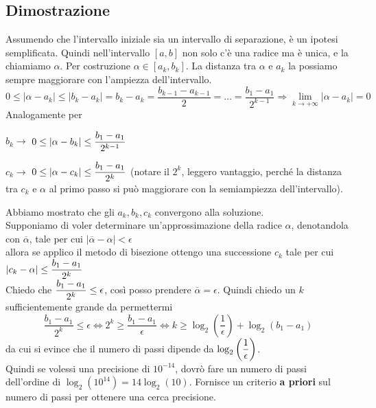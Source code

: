\documentclass[10pt]{book}
\begin{document}
\subsection{Dimostrazione} Assumendo che l'intervallo iniziale sia un intervallo di separazione, è un ipotesi semplificata. Quindi nell'intervallo $[a, b]$ non solo c'è una radice ma è unica, e la chiamiamo $\alpha$. Per costruzione $\alpha \in [a_k, b_k]$. La distanza tra $\alpha$ e $a_k$ la possiamo sempre maggiorare con l'ampiezza dell'intervallo.
$$0 \leq |\alpha - a_k| \leq |b_k - a_k| = b_k - a_k = \frac{b_{k-1} - a_{k-1}}{2} = \ldots = \frac{b_1 - a_1}{2^{k-1}} \Rightarrow \lim_{k\to +\infty} |\alpha - a_k| = 0$$
Analogamente per \begin{list}{}{}
	\item $b_k\rightarrow$ $0\leq |\alpha - b_k| \leq \mathlarger{\frac{b_1 - a_1}{2^{k-1}}}$
	\item $c_k\rightarrow$ $0\leq |\alpha - c_k| \leq \mathlarger{\frac{b_1 - a_1}{2^{k}}}$ (notare il $2^k$, leggero vantaggio, perché la distanza tra $c_k$ e $\alpha$ al primo passo si può maggiorare con la semiampiezza dell'intervallo).
\end{list}
Abbiamo mostrato che gli $a_k, b_k, c_k$ convergono alla soluzione.\\
Supponiamo di voler determinare un'approssimazione della radice $\alpha$, denotandola con $\overline{\alpha}$, tale per cui $|\overline{\alpha} - \alpha| < \epsilon$\\ allora se applico il metodo di bisezione ottengo una successione $c_k$ tale per cui $|c_k - \alpha| \leq \mathlarger{\frac{b_1 - a_1}{2^k}}$\\
Chiedo che $\mathlarger{\frac{b_1 - a_1}{2^k}} \leq \epsilon$, così posso prendere $\overline{\alpha} = \epsilon$. Quindi chiedo un $k$ sufficientemente grande da permettermi $$\frac{b_1 - a_1}{2^k} \leq \epsilon \Leftrightarrow 2^k \geq \frac{b_1 - a_1}{\epsilon} \Leftrightarrow k \geq \log_2\left(\frac{1}{\epsilon}\right) + \log_2\left(b_1 - a_1\right)$$
da cui si evince che il numero di passi dipende da $\log_2\left(\mathlarger{\frac{1}{\epsilon}}\right)$.\\
Quindi se volessi una precisione di $10^{-14}$, dovrò fare un numero di passi dell'ordine di $\log_2(10^{14}) = 14\log_2(10)$. Fornisce un criterio \textbf{a priori} sul numero di passi per ottenere una cerca precisione.
\end{document}
